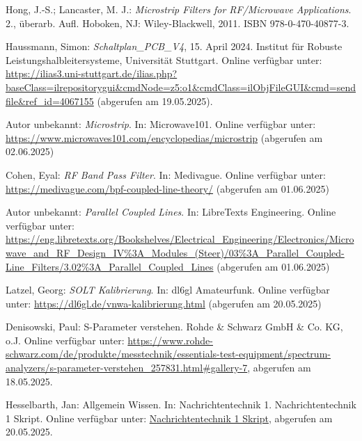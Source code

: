 \begin{thebibliography}{1}
Hong, J.-S.; Lancaster, M. J.: \emph{Microstrip Filters for RF/Microwave Applications}. 2., überarb. Aufl. Hoboken, NJ: Wiley-Blackwell, 2011. ISBN 978-0-470-40877-3.

Haussmann, Simon: \emph{Schaltplan\_PCB\_V4}, 15. April 2024. Institut für Robuste Leistungshalbleitersysteme, Universität Stuttgart. Online verfügbar unter: \url{https://ilias3.uni-stuttgart.de/ilias.php?baseClass=ilrepositorygui&cmdNode=z5:o1&cmdClass=ilObjFileGUI&cmd=sendfile&ref_id=4067155} (abgerufen am 19.05.2025).


Autor unbekannt: \emph{Microstrip}. In: Microwave101. Online verfügbar unter: \url{https://www.microwaves101.com/encyclopedias/microstrip} (abgerufen am 02.06.2025)


Cohen, Eyal: \emph{RF Band Pass Filter}. In: Medivague. Online verfügbar unter: \url{https://medivague.com/bpf-coupled-line-theory/} (abgerufen am 01.06.2025)


Autor unbekannt: \emph{Parallel Coupled Lines}. In: LibreTexts Engineering. Online verfügbar unter: \url{https://eng.libretexts.org/Bookshelves/Electrical_Engineering/Electronics/Microwave_and_RF_Design_IV%3A_Modules_(Steer)/03%3A_Parallel_Coupled-Line_Filters/3.02%3A_Parallel_Coupled_Lines} (abgerufen am 01.06.2025)


Latzel, Georg: \emph{SOLT Kalibrierung}. In: dl6gl Amateurfunk. Online verfügbar unter: \url{https://dl6gl.de/vnwa-kalibrierung.html} (abgerufen am 20.05.2025)
  
Denisowski, Paul: S-Parameter verstehen. Rohde \& Schwarz GmbH \& Co. KG, o.J. Online verfügbar unter: \url{https://www.rohde-schwarz.com/de/produkte/messtechnik/essentials-test-equipment/spectrum-analyzers/s-parameter-verstehen_257831.html#gallery-7}, abgerufen am 18.05.2025.

Hesselbarth, Jan: Allgemein Wissen. In: Nachrichtentechnik 1. Nachrichtentechnik 1 Skript. Online verfügbar unter: \url{Nachrichtentechnik 1 Skript}, abgerufen am 20.05.2025.




\end{thebibliography}

\clearpage

